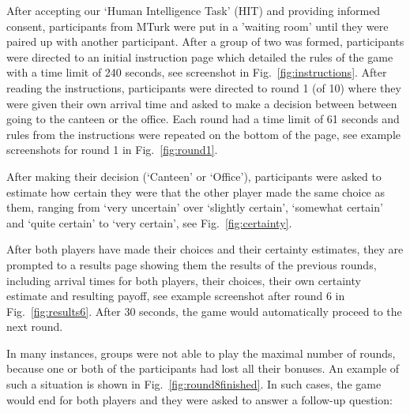\documentclass[a4paper,superscriptaddress,nofootinbib]{revtex4}
\begin{document}
After accepting our `Human Intelligence Task' (HIT) and providing informed consent, participants from MTurk were put in a ’waiting room’ until they were paired up with another participant. After a group of two was formed, participants were directed to an initial instruction page which detailed the rules of the game with a time limit of 240 seconds, see screenshot in Fig.~\ref{fig:instructions}.
After reading the instructions, participants were directed to round 1 (of 10) where they were given their own arrival time and asked to make a decision between between going to the canteen or the office. Each round had a time limit of 61 seconds and rules from the instructions were repeated on the bottom of the page, see example screenshots for round 1 in Fig.~\ref{fig:round1}.

After making their decision (`Canteen' or `Office'), participants were asked to estimate how certain they were that the other player made the same choice as them, ranging from `very uncertain' over `slightly certain', `somewhat certain' and `quite certain' to `very certain', see Fig.~\ref{fig:certainty}.

After both players have made their choices and their certainty estimates, they are prompted to a results page showing them the results of the previous rounds, including arrival times for both players, their choices, their own certainty estimate and resulting payoff, see example screenshot after round 6 in Fig.~\ref{fig:results6}. After 30 seconds, the game would automatically proceed to the next round.

In many instances, groups were not able to play the maximal number of rounds, because one or both of the participants had lost all their bonuses. An example of such a situation is shown in Fig.~\ref{fig:round8finished}. In such cases, the game would end for both players and they were asked to answer a follow-up question: 
\end{document}
